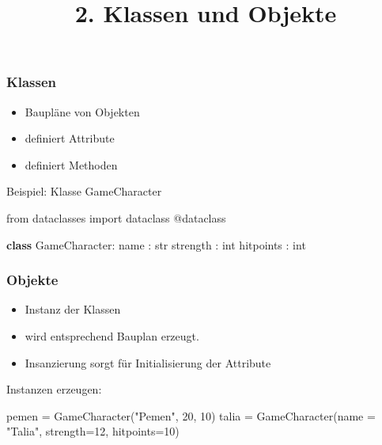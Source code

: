 \documentclass[
  11pt,
  a4paper,
  DIV=11,
  numbers=noendperiod]{scrartcl}
\title{2. Klassen und Objekte}
\author{}
\date{}
\newenvironment{Shaded}{\begin{snugshade}}{\end{snugshade}}
\newcommand{\AttributeTok}[1]{\textcolor[rgb]{0.40,0.45,0.13}{#1}}
\newcommand{\BuiltInTok}[1]{\textcolor[rgb]{0.00,0.23,0.31}{#1}}
\newcommand{\DecValTok}[1]{\textcolor[rgb]{0.68,0.00,0.00}{#1}}
\newcommand{\ImportTok}[1]{\textcolor[rgb]{0.00,0.46,0.62}{#1}}
\newcommand{\KeywordTok}[1]{\textcolor[rgb]{0.00,0.23,0.31}{\textbf{#1}}}
\newcommand{\NormalTok}[1]{\textcolor[rgb]{0.00,0.23,0.31}{#1}}
\newcommand{\OperatorTok}[1]{\textcolor[rgb]{0.37,0.37,0.37}{#1}}
\newcommand{\StringTok}[1]{\textcolor[rgb]{0.13,0.47,0.30}{#1}}
\providecommand{\tightlist}{%
  \setlength{\itemsep}{0pt}\setlength{\parskip}{0pt}}\usepackage{longtable,booktabs,array}
\begin{document}
\maketitle


\subsubsection{Klassen}\label{klassen}

\begin{itemize}
\tightlist
\item
  Baupläne von Objekten
\item
  definiert Attribute
\item
  definiert Methoden
\end{itemize}

Beispiel: Klasse GameCharacter

\begin{Shaded}
\begin{Highlighting}[numbers=left,,]
\ImportTok{from}\NormalTok{ dataclasses }\ImportTok{import}\NormalTok{ dataclass}
\AttributeTok{@dataclass}

\KeywordTok{class}\NormalTok{ GameCharacter:}
\NormalTok{    name : }\BuiltInTok{str}
\NormalTok{    strength : }\BuiltInTok{int}
\NormalTok{    hitpoints : }\BuiltInTok{int}
\end{Highlighting}
\end{Shaded}

\subsubsection{Objekte}\label{objekte}

\begin{itemize}
\tightlist
\item
  Instanz der Klassen
\item
  wird entsprechend Bauplan erzeugt.
\item
  Insanzierung sorgt für Initialisierung der Attribute
\end{itemize}

Instanzen erzeugen:

\begin{Shaded}
\begin{Highlighting}[numbers=left,,]
\NormalTok{pemen }\OperatorTok{=}\NormalTok{ GameCharacter(}\StringTok{"Pemen"}\NormalTok{, }\DecValTok{20}\NormalTok{, }\DecValTok{10}\NormalTok{)}
\NormalTok{talia }\OperatorTok{=}\NormalTok{ GameCharacter(name }\OperatorTok{=} \StringTok{"Talia"}\NormalTok{, strength}\OperatorTok{=}\DecValTok{12}\NormalTok{, hitpoints}\OperatorTok{=}\DecValTok{10}\NormalTok{)}
\end{Highlighting}
\end{Shaded}
\end{document}
